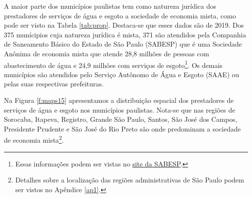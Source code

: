 
\vspace{1cm}

\begin{multicols}{2}
 A maior parte dos municípios paulistas tem como natureza jurídica dos prestadores de serviços de água e esgoto a sociedade de economia mista, como pode ser visto na Tabela \ref{tab:prop}. Destaca-se que esses dados são de 2019. Dos 375 munícipios cuja natureza jurídica é mista, 371 são atendidos pela Companhia de Saneamento Básico do Estado de São Paulo (SABESP) que é uma Sociedade Anônima de economia mista que atende 28,8 milhões de pessoas com abastecimento de água e 24,9 milhões com serviços de esgoto\footnote{Essas informações podem ser vistas no \href{http://site.sabesp.com.br/site/interna/Default.aspx?secaoId=505}{site da SABESP}. }. Os demais municípios são atendidos pelo Serviço Autônomo de Água e Esgoto (SAAE) ou pelas suas respectivas prefeituras. 

\end{multicols}






\begin{multicols}{2}
	Na Figura \ref{f:maps15}	 apresentamos a distribuição espacial dos prestadores de serviços de água e esgoto nos municípios paulistas. Nota-se que nas regiões de Sorocaba, Itapeva, Registro, Grande São Paulo, Santos, São José dos Campos, Presidente Prudente e São José do Rio Preto são onde predominam a sociedade de economia mista\footnote{Detalhes sobre a localização das regiões administrativas de São Paulo podem ser vistos no Apêndice \ref{ap1}.}. 
	
\end{multicols}


